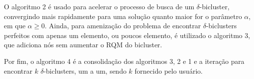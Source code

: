 \documentclass[
    12pt,                %
    oneside,            %
    a4paper,            %
    english,            %
    brazil                %
    ]{abntex2ppgsi}
\begin{document}


O algoritmo 2 é usado para acelerar o processo de busca de um $\delta$-bicluster, convergindo mais rapidamente para uma solução quanto maior for o parâmetro $\alpha$, em que $\alpha \geq 0$. Ainda, para amenização do problema de encontrar $\delta$-biclusters perfeitos com apenas um elemento, ou poucos elemento, é utilizado o algoritmo 3, que adiciona nós sem aumentar o RQM do bicluster.



Por fim, o algoritmo 4 é a consolidação dos algoritmos 3, 2 e 1 e a iteração para encontrar $k$ $\delta$-biclusters, um a um, sendo $k$ fornecido pelo usuário.
\end{document}
